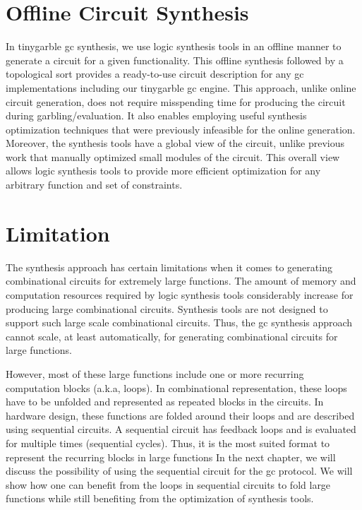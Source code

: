 \section{Offline Circuit Synthesis}\label{sec:syn-offline}
In \gls{tinygarble} \acrshort{gc} synthesis, we use logic synthesis tools in an offline manner to generate a circuit for a given functionality.
This offline synthesis followed by a topological sort provides a ready-to-use circuit description for any \acrshort{gc} implementations including our \gls{tinygarble} \acrshort{gc} engine.
This approach, unlike online circuit generation, does not require misspending time for producing the circuit during garbling/evaluation.
It also enables employing useful synthesis optimization techniques that were previously infeasible for the online generation.
Moreover, the synthesis tools have a global view of the circuit, unlike previous work that manually optimized small modules of the circuit.
This overall view allows logic synthesis tools to provide more efficient optimization for any arbitrary function and set of constraints.

\section{Limitation}\label{sec:syn-limit}
The synthesis approach has certain limitations when it comes to generating combinational circuits for extremely large functions.
The amount of memory and computation resources required by logic synthesis tools considerably increase for producing large combinational circuits.
Synthesis tools are not designed to support such large scale combinational circuits.
Thus, the \acrshort{gc} synthesis approach cannot scale, at least automatically, for generating combinational circuits for large functions.

However, most of these large functions include one or more recurring computation blocks (a.k.a, loops).
In combinational representation, these loops have to be unfolded and represented as repeated blocks in the circuits.
In hardware design, these functions are folded around their loops and are described using sequential circuits.
A sequential circuit has feedback loops and is evaluated for multiple times (sequential cycles).
Thus, it is the most suited format to represent the recurring blocks in large functions
In the next chapter, we will discuss the possibility of using the sequential circuit for the \acrshort{gc} protocol.
We will show how one can benefit from the loops in sequential circuits to fold large functions while still benefiting from the optimization of synthesis tools.
